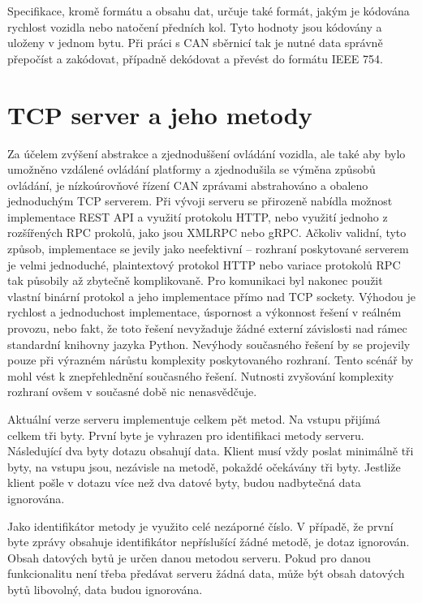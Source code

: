 \documentclass[czech, bachelor]{diploma}
\begin{document}
Specifikace, kromě formátu a obsahu dat, určuje také formát, jakým je kódována rychlost vozidla nebo natočení předních kol. Tyto
hodnoty jsou kódovány a uloženy v jednom bytu. Při práci s CAN sběrnicí tak je nutné data správně přepočíst a zakódovat, případně
dekódovat a převést do formátu IEEE 754.

\section{TCP server a jeho metody} \label{server-methods}

Za účelem zvýšení abstrakce a zjednoduššení ovládání vozidla, ale také aby bylo umožněno vzdálené ovládání platformy
a zjednodušila se výměna způsobů ovládání, je nízkoúrovňové řízení CAN zprávami abstrahováno a obaleno jednoduchým TCP serverem.
Při vývoji serveru se přirozeně nabídla možnost implementace REST API a využití protokolu HTTP, nebo využití jednoho z rozšířených
RPC prokolů, jako jsou XMLRPC nebo gRPC. Ačkoliv validní, tyto způsob, implementace se jevily jako neefektivní -- rozhraní
poskytované serverem je velmi jednoduché, plaintextový protokol HTTP nebo variace protokolů RPC tak působily až zbytečně
komplikovaně. Pro komunikaci byl nakonec použit vlastní binární protokol a jeho implementace přímo nad TCP sockety.
Výhodou je rychlost a jednoduchost implementace, úspornost a výkonnost řešení v reálném provozu, nebo fakt, že toto řešení
nevyžaduje žádné externí závislosti nad rámec standardní knihovny jazyka Python. Nevýhody současného řešení by se projevily
pouze při výrazném nárůstu komplexity poskytovaného rozhraní. Tento scénář by mohl vést k znepřehlednění současného řešení.
Nutnosti zvyšování komplexity rozhraní ovšem v současné době nic nenasvědčuje.

Aktuální verze serveru implementuje celkem pět metod. Na vstupu přijímá celkem tři byty. První byte je vyhrazen pro identifikaci
metody serveru. Následující dva byty dotazu obsahují data. Klient musí vždy poslat minimálně tři byty, na vstupu jsou, nezávisle
na metodě, pokaždé očekávány tři byty. Jestliže klient pošle v dotazu více než dva datové byty, budou nadbytečná data ignorována.

Jako identifikátor metody je využito celé nezáporné číslo. V případě, že první byte zprávy obsahuje identifikátor nepříslušící
žádné metodě, je dotaz ignorován. Obsah datových bytů je určen danou metodou serveru. Pokud pro danou funkcionalitu není třeba
předávat serveru žádná data, může být obsah datových bytů libovolný, data budou ignorována.
\end{document}
